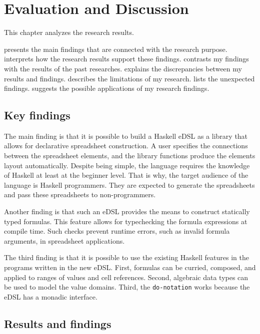 \chapter{Evaluation and Discussion}
\label{chap:eval}

This chapter analyzes the research results.

 presents the main findings that are connected with the research purpose.
 interprets how the research results support these findings.
 contrasts my findings with the results of the past researches.
 explains the discrepancies between my results and findings.
 describes the limitations of my research.
 lists the unexpected findings.
 suggests the possible applications of my research findings.

\section{Key findings}
\label{eval:findings}


The main finding is that it is possible to build a Haskell eDSL as a library that allows for declarative spreadsheet construction.
A user specifies the connections between the spreadsheet elements, and the library functions produce the elements layout automatically.
Despite being simple, the language requires the knowledge of Haskell at least at the beginner level.
That is why, the target audience of the language is Haskell programmers.
They are expected to generate the spreadsheets and pass these spreadsheets to non-programmers.

Another finding is that such an eDSL provides the means to construct statically typed formulas.
This feature allows for typechecking the formula expressions at compile time.
Such checks prevent runtime errors, such as invalid formula arguments, in spreadsheet applications.

The third finding is that it is possible to use the existing Haskell features in the programs written in the new eDSL.
First, formulas can be curried, composed, and applied to ranges of values and cell references.
Second, algebraic data types can be used to model the value domains.
Third, the \texttt{do-notation} works because the eDSL has a monadic interface.

\section{Results and findings}
\label{eval:finding-results}

